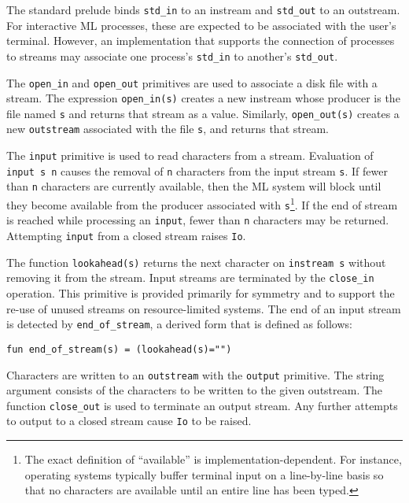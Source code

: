 The standard prelude binds \verb"std_in" to an instream and
\verb"std_out" to an outstream.  For interactive ML processes, these
are expected to be associated with the user's terminal.  However, an
implementation that supports the connection of processes to streams
may associate one process's \verb"std_in" to another's
\verb"std_out".

The \verb"open_in" and \verb"open_out" primitives are used to
associate a disk file with a stream.  The expression
\verb"open_in(s)" creates a new instream whose producer is the file
named \verb"s" and returns that stream as a value.
Similarly, \verb"open_out(s)" creates a new \verb"outstream"
associated with the file \verb"s", and returns that stream.

The \verb"input" primitive is used to read characters from a stream.
Evaluation of \verb"input s n" causes the removal of \verb"n"
characters from the input stream \verb"s".  If fewer than \verb"n"
characters are currently available, then the ML system will block
until they become available from the producer associated with
\verb"s"\footnote{The exact definition of ``available'' is
implementation-dependent.  For instance, operating systems typically
buffer terminal input on a line-by-line basis so that no characters
are available until an entire line has been typed.}.
If the end of stream is reached while processing an \verb"input",
fewer than \verb"n" characters may be returned.  
Attempting \verb"input" from a closed stream raises
\verb"Io".

The function \verb"lookahead(s)" returns the next character on
\verb"instream s" without removing it from the stream.  Input streams
are terminated by the \verb"close_in" operation.  This primitive is
provided primarily for symmetry and to support the re-use of
unused streams on resource-limited systems.  The end of an input
stream is detected by \verb"end_of_stream", a derived form that is
defined as follows:
\begin{verbatim}
fun end_of_stream(s) = (lookahead(s)="")
\end{verbatim}

Characters are written to an \verb"outstream" with the \verb"output"
primitive.  The string argument consists of the characters to be
written to the given outstream.  The function \verb"close_out" is
used to terminate an output stream.  Any further attempts to output
to a closed stream cause \verb"Io" to be raised.

